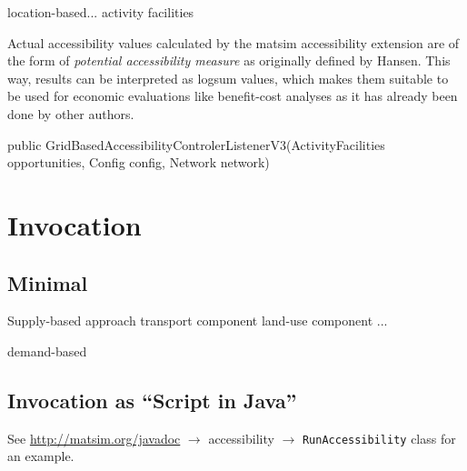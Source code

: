 location-based... activity facilities

Actual accessibility values calculated by the \gls{matsim} accessibility extension are of the form of \textit{potential 
	accessibility measure} as originally defined by Hansen. This way, results can be interpreted as \gls{logsum} values, 
which makes them suitable to be used for economic evaluations like benefit-cost analyses as it has already been done 
by other authors.




public GridBasedAccessibilityControlerListenerV3(ActivityFacilities opportunities, Config config, Network network)

\section{Invocation}

\subsection{Minimal}

Supply-based approach
transport component
land-use component
...


demand-based



\subsection{Invocation as \enquote{Script in Java}}

See \url{http://matsim.org/javadoc} $\to$ accessibility $\to$ \lstinline{RunAccessibility} class for an example.




